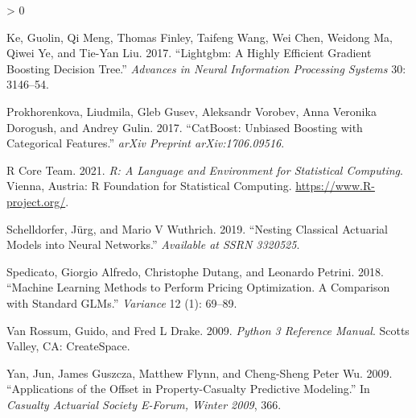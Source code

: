 \documentclass[
]{article}
\newlength{\cslhangindent}
\newenvironment{CSLReferences}[2] %
 {%
  \setlength{\parindent}{0pt}
  \ifodd #1 \everypar{\setlength{\hangindent}{\cslhangindent}}\ignorespaces\fi
  \ifnum #2 > 0
  \setlength{\parskip}{#2\baselineskip}
  \fi
 }%
 {}
\begin{document}
\begin{CSLReferences}{1}{0}
\leavevmode\hypertarget{ref-ke2017lightgbm}{}%
Ke, Guolin, Qi Meng, Thomas Finley, Taifeng Wang, Wei Chen, Weidong Ma,
Qiwei Ye, and Tie-Yan Liu. 2017. {``Lightgbm: A Highly Efficient
Gradient Boosting Decision Tree.''} \emph{Advances in Neural Information
Processing Systems} 30: 3146--54.

\leavevmode\hypertarget{ref-prokhorenkova2017catboost}{}%
Prokhorenkova, Liudmila, Gleb Gusev, Aleksandr Vorobev, Anna Veronika
Dorogush, and Andrey Gulin. 2017. {``CatBoost: Unbiased Boosting with
Categorical Features.''} \emph{arXiv Preprint arXiv:1706.09516}.

\leavevmode\hypertarget{ref-RSoftware}{}%
R Core Team. 2021. \emph{R: A Language and Environment for Statistical
Computing}. Vienna, Austria: R Foundation for Statistical Computing.
\url{https://www.R-project.org/}.

\leavevmode\hypertarget{ref-schelldorfer2019nesting}{}%
Schelldorfer, Jürg, and Mario V Wuthrich. 2019. {``Nesting Classical
Actuarial Models into Neural Networks.''} \emph{Available at SSRN
3320525}.

\leavevmode\hypertarget{ref-spedicato2018machine}{}%
Spedicato, Giorgio Alfredo, Christophe Dutang, and Leonardo Petrini.
2018. {``Machine Learning Methods to Perform Pricing Optimization. A
Comparison with Standard GLMs.''} \emph{Variance} 12 (1): 69--89.

\leavevmode\hypertarget{ref-python3}{}%
Van Rossum, Guido, and Fred L Drake. 2009. \emph{{Python 3 Reference
Manual}}. Scotts Valley, CA: CreateSpace.

\leavevmode\hypertarget{ref-yan_applications_2009}{}%
Yan, Jun, James Guszcza, Matthew Flynn, and Cheng-Sheng Peter Wu. 2009.
{``Applications of the Offset in Property-Casualty Predictive
Modeling.''} In \emph{Casualty {Actuarial} {Society} {E}-{Forum},
{Winter} 2009}, 366.

\end{CSLReferences}
\end{document}
